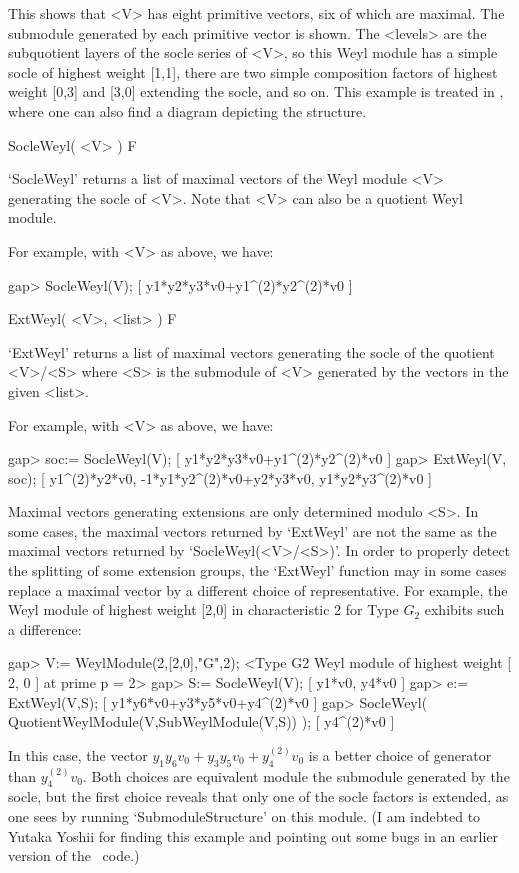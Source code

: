 This shows that <V> has eight primitive vectors, six of which are
maximal. The submodule generated by each primitive vector is
shown. The <levels> are the subquotient layers of the socle series of
<V>, so this Weyl module has a simple socle of highest weight [1,1],
there are two simple composition factors of highest weight [0,3] and
[3,0] extending the socle, and so on. This example is treated in
\cite{DM}, where one can also find a diagram depicting the structure.


\>SocleWeyl( <V> ) F

`SocleWeyl' returns a list of maximal vectors of the Weyl module <V>
generating the socle of <V>. Note that <V> can also be a quotient Weyl
module.

For example, with <V> as above, we have:

\beginexample
gap> SocleWeyl(V);
[ y1*y2*y3*v0+y1^(2)*y2^(2)*v0 ]
\endexample

\>ExtWeyl( <V>, <list> ) F

`ExtWeyl' returns a list of maximal vectors generating the socle
of the quotient <V>/<S> where <S> is the submodule of <V> generated by
the vectors in the given <list>. 

For example, with <V> as above, we have:

\beginexample
gap> soc:= SocleWeyl(V);
[ y1*y2*y3*v0+y1^(2)*y2^(2)*v0 ]
gap> ExtWeyl(V, soc);
[ y1^(2)*y2*v0, -1*y1*y2^(2)*v0+y2*y3*v0, y1*y2*y3^(2)*v0 ]
\endexample

Maximal vectors generating extensions are only determined modulo <S>.
In some cases, the maximal vectors returned by `ExtWeyl' are not the
same as the maximal vectors returned by `SocleWeyl(<V>/<S>)'. In order
to properly detect the splitting of some extension groups, the
`ExtWeyl' function may in some cases replace a maximal vector by a
different choice of representative. For example, the Weyl module of
highest weight [2,0] in characteristic 2 for Type $G_2$ exhibits such
a difference:

\beginexample
gap> V:= WeylModule(2,[2,0],"G",2);
<Type G2 Weyl module of highest weight [ 2, 0 ] at prime p = 2>
gap> S:= SocleWeyl(V);
[ y1*v0, y4*v0 ]
gap> e:= ExtWeyl(V,S);
[ y1*y6*v0+y3*y5*v0+y4^(2)*v0 ]
gap> SocleWeyl( QuotientWeylModule(V,SubWeylModule(V,S)) );
[ y4^(2)*v0 ]
\endexample

In this case, the vector $y_1 y_6 v_0+y_3y_5v_0+y_4^{(2)}v_0$ is a
better choice of generator than $y_4^{(2)}v_0$. Both choices are
equivalent module the submodule generated by the socle, but the first
choice reveals that only one of the socle factors is extended, as one
sees by running `SubmoduleStructure' on this module. (I am indebted to
Yutaka Yoshii for finding this example and pointing out some bugs in
an earlier version of the \GAP\ code.)

